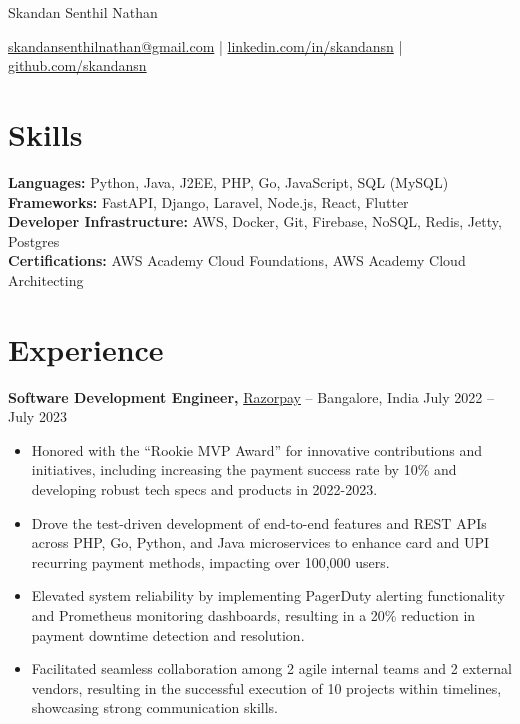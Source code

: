 \documentclass[11pt]{article}       %
\begin{document}
\centerline{\Huge Skandan Senthil Nathan}

\vspace{5pt}

\centerline{\href{mailto:skandansenthilnathan@gmail.com}{skandansenthilnathan@gmail.com} | \href{https://www.linkedin.com/in/skandansn/}{linkedin.com/in/skandansn} | \href{https://github.com/skandansn}{github.com/skandansn}}

\vspace{-10pt}

\section*{Skills}
\textbf{Languages:}  Python, Java, J2EE, PHP, Go, JavaScript, SQL (MySQL) \\\textbf{Frameworks:}  FastAPI, Django, Laravel, Node.js, React, Flutter \\\textbf{Developer Infrastructure:}  AWS, Docker, Git, Firebase, NoSQL, Redis, Jetty, Postgres \\\textbf{Certifications:}  AWS Academy Cloud Foundations, AWS Academy Cloud Architecting \\\label{skillsSection}


\vspace{-6.5pt}

\section*{Experience}
\textbf{Software Development Engineer,} \href{https://razorpay.com/}{Razorpay} -- Bangalore, India \hfill July 2022 -- July 2023 \\
\vspace{-9pt}
\begin{itemize}
  \label{sde}
  
\item Honored with the ``Rookie MVP Award'' for innovative contributions and initiatives, including increasing the payment success rate by 10\% and developing robust tech specs and products in 2022-2023.\item Drove the test-driven development of end-to-end features and REST APIs across PHP, Go, Python, and Java microservices to enhance card and UPI recurring payment methods, impacting over 100,000 users.\item Elevated system reliability by implementing PagerDuty alerting functionality and Prometheus monitoring dashboards, resulting in a 20\% reduction in payment downtime detection and resolution.\item Facilitated seamless collaboration among 2 agile internal teams and 2 external vendors, resulting in the successful execution of 10 projects within timelines, showcasing strong communication skills.\end{itemize}
\end{document}
